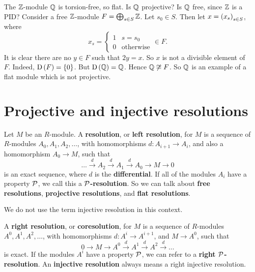 \begin{example*}
The $ \mathbb{Z} $-module $ \mathbb{Q} $ is torsion-free, so flat. Is $ \mathbb{Q} $ projective? Is $ \mathbb{Q} $ free, since $ \mathbb{Z} $ is a PID? Consider a free $ \mathbb{Z} $-module $ F = \bigoplus_{s \in S} \mathbb{Z} $. Let $ s_0 \in S $. Then let $ x = \br{x_s}_{s \in S} $, where
$$ x_s =
\begin{cases}
1 & s = s_0 \\
0 & \text{otherwise}
\end{cases}
\in F. $$
It is clear there are no $ y \in F $ such that $ 2y = x $. So $ x $ is not a divisible element of $ F $. Indeed, $ \D\br{F} = \cbr{0} $. But $ \D\br{\QQ} = \QQ $. Hence $ \mathbb{Q} \not\cong F $. So $ \mathbb{Q} $ is an example of a flat module which is not projective.
\end{example*}

\pagebreak

\section{Projective and injective resolutions}

\begin{definition}
Let $ M $ be an $ R $-module. A \textbf{resolution}, or \textbf{left resolution}, for $ M $ is a sequence of $ R $-modules $ A_0, A_1, A_2, \dots $, with homomorphisms $ d : A_{i + 1} \to A_i $, and also a homomorphism $ A_0 \to M $, such that
$$ \dots \xrightarrow{d} A_2 \xrightarrow{d} A_1 \xrightarrow{d} A_0 \to M \to 0 $$
is an exact sequence, where $ d $ is the \textbf{differential}. If all of the modules $ A_i $ have a property $ \mathcal{P} $, we call this a \textbf{$ \mathcal{P} $-resolution}. So we can talk about \textbf{free resolutions}, \textbf{projective resolutions}, and \textbf{flat resolutions}.
\end{definition}

We do not use the term injective resolution in this context.

\begin{definition}
A \textbf{right resolution}, or \textbf{coresolution}, for $ M $ is a sequence of $ R $-modules $ A^0, A^1, A^2, \dots $, with homomorphisms $ d : A^i \to A^{i + 1} $, and $ M \to A^0 $, such that
$$ 0 \to M \to A^0 \xrightarrow{d} A^1 \xrightarrow{d} A^2 \xrightarrow{d} \dots $$
is exact. If the modules $ A^i $ have a property $ \mathcal{P} $, we can refer to a \textbf{right $ \mathcal{P} $-resolution}. An \textbf{injective resolution} always means a right injective resolution.
\end{definition}

